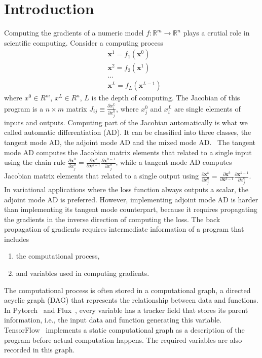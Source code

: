 \documentclass[aps,twocolumn,longbibliography,english,superscriptaddress]{revtex4-1}
\newcommand{\<}{\langle}
\renewcommand{\>}{\rangle}
\newcommand{\vx}{{\mathbf{x}}}
\theoremstyle{definition}\newtheorem{definition}{\textit{Definition}}
\begin{document}
\section{Introduction}\label{sec:intro}
    Computing the gradients of a numeric model $f : \mathbb{R}^m \rightarrow \mathbb{R}^n$ plays a crutial role in scientific computing. Consider a computing process
\begin{align*}
    &\vx^1 = f_1(\vx^0)\\
    &\vx^2 = f_2(\vx^1)\\
    &\ldots\\
    &\vx^L = f_L(\vx^{L-1})
\end{align*}
where $x^0\in R^m$, $x^L\in R^n$, $L$ is the depth of computing.
The Jacobian of this program is a $n\times m$ matrix $J_{ij} \equiv \frac{\partial x^L_i}{\partial x_j^0}$, where $x_j^0$ and $x_i^L$ are single elements of inputs and outputs.
Computing part of the Jacobian automatically is what we called automatic differentiation (AD). It can be classified into three classes, the tangent mode AD, the adjoint mode AD and the mixed mode AD.~\cite{Hascoet2013}
The tangent mode AD computes the Jacobian matrix elements that related to a single input using the chain rule $\frac{\partial \vx^k}{\partial x^0_j} = \frac{\partial \vx^k}{\partial \vx^{k-1}}\frac{\partial \vx^{k-1}}{\partial x^0_j}$, while a tangent mode AD computes Jacobian matrix elements that related to a single output using $\frac{\partial \vx^k}{\partial x^0_j} = \frac{\partial \vx^k}{\partial \vx^{k-1}}\frac{\partial \vx^{k-1}}{\partial x^0_j}$.
    In variational applications where the loss function always outputs a scalar, the adjoint mode AD is preferred.
However, implementing adjoint mode AD is harder than implementing its tangent mode counterpart, because it requires propagating the gradients in the inverse direction of computing the loss. The back propagation of gradients requires intermediate information of a program that includes
\begin{enumerate}
    \item the computational process,
    \item and variables used in computing gradients.
\end{enumerate}
    The computational process is often stored in a computational graph, a directed acyclic graph (DAG) that represents the relationship between data and functions. In Pytorch~\cite{Paszke2017} and Flux~\cite{Innes2018a}, every variable has a tracker field that stores its parent information, i.e., the input data and function generating this variable. TensorFlow~\cite{Tensorflow2015} implements a static computational graph as a description of the program before actual computation happens. The required variables are also recorded in this graph.
\end{document}
